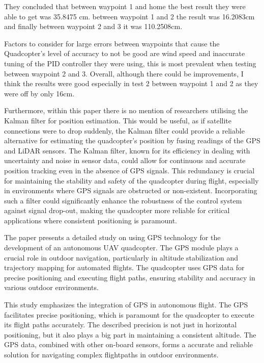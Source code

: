 \documentclass{article}
\begin{document}
They concluded that between waypoint 1 and home the best result they were able to get was 35.8475 cm. between waypoint 1 and 2 the result was 16.2083cm and finally between waypoint 2 and 3 it was 110.2508cm.

Factors to consider for large errors between waypoints that cause the Quadcopter's level of accuracy to not be good are wind speed and inaccurate tuning of the PID controller they were using, this is most prevalent when testing between waypoint 2 and 3. Overall, although there could be improvements, I think the results were good especially in test 2 between waypoint 1 and 2 as they were off by only 16cm.

Furthermore, within this paper there is no mention of researchers utilising the Kalman filter for position estimation. This would be useful, as if satellite connections were to drop suddenly, the Kalman filter could provide a reliable alternative for estimating the quadcopter's position by fusing readings of the GPS and LiDAR sensors. The Kalman filter, known for its efficiency in dealing with uncertainty and noise in sensor data, could allow for continuous and accurate position tracking even in the absence of GPS signals. This redundancy is crucial for maintaining the stability and safety of the quadcopter during flight, especially in environments where GPS signals are obstructed or non-existent. Incorporating such a filter could significantly enhance the robustness of the control system against signal drop-out, making the quadcopter more reliable for critical applications where consistent positioning is paramount.

The paper presents a detailed study on using GPS technology for the development of an autonomous UAV quadcopter. The GPS module plays a crucial role in outdoor navigation, particularly in altitude stabilization and trajectory mapping for automated flights. The quadcopter uses GPS data for precise positioning and executing flight paths, ensuring stability and accuracy in various outdoor environments.

This study \cite{AkademiaBaru2016} emphasizes the integration of GPS in autonomous flight. The GPS facilitates precise positioning, which is paramount for the quadcopter to execute its flight paths accurately. The described precision is not just in horizontal positioning, but it also plays a big part in maintaining a consistent altitude. The GPS data, combined with other on-board sensors, forms a accurate and reliable solution for navigating complex flightpaths in outdoor environments.
\end{document}

